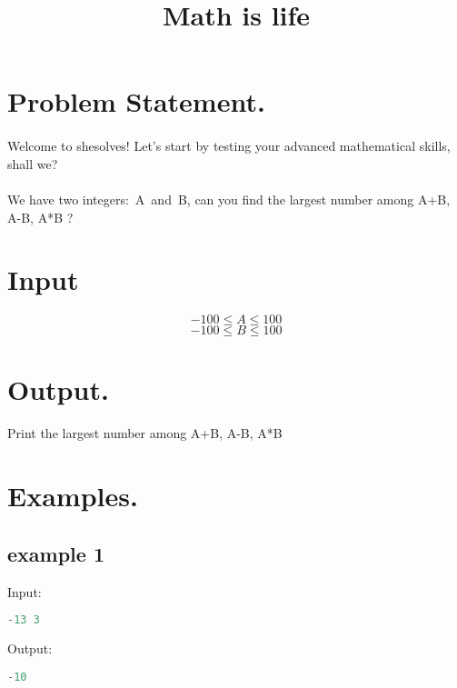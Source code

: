 \documentclass[10pt]{article}
\begin{document}
\title{Math is life}
 \date{}
\maketitle
\section{Problem Statement.}
\paragraph{}
Welcome to shesolves!
Let’s start by testing your advanced mathematical skills, shall we?
\paragraph{}
We have two integers: A and B, can you find the largest number among A+B, A-B, A*B ?
\paragraph{}
\section{Input}
$$ -100\le A \le 100 $$
$$ -100\le B \le 100 $$
\section{Output.}
Print the largest number among A+B, A-B, A*B
\section{Examples.}
\subsection{example 1}
Input:
\begin{lstlisting}[language=Python]
-13 3
\end{lstlisting}
Output:
\begin{lstlisting}[language=Python]
-10
\end{lstlisting}
\end{document}
